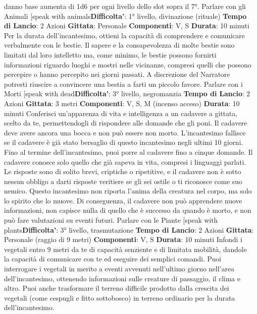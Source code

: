 \begin{multicols}{2}
danno base aumenta di 1d6 per ogni livello dello slot
sopra il 7°.
Parlare con gli Animali
[speak with animals\textbf{Difficolta'}:
1° livello, divinazione (rituale)
\textbf{Tempo di Lancio}: 2 Azioni
\textbf{Gittata}: Personale
\textbf{Componenti}: V, S
\textbf{Durata}: 10 minuti
Per la durata dell’incantesimo, ottieni la capacità di
comprendere e comunicare verbalmente con le bestie.
Il sapere e la consapevolezza di molte bestie sono
limitati dal loro intelletto ma, come minimo, le bestie
possono fornirti informazioni riguardo luoghi e mostri
nelle vicinanze, compresi quelli che possono percepire
o hanno percepito nei giorni passati. A discrezione del
Narratore potresti riuscire a convincere una bestia a farti un
piccolo favore.
Parlare con i Morti
[speak with dead\textbf{Difficolta'}:
3° livello, negromanzia
\textbf{Tempo di Lancio}: 2 Azioni
\textbf{Gittata}: 3 metri
\textbf{Componenti}: V, S, M (incenso acceso)
\textbf{Durata}: 10 minuti
Conferisci un’apparenza di vita e intelligenza a un
cadavere a gittata, scelto da te, permettendogli di
rispondere alle domande che gli poni. Il cadavere deve
avere ancora una bocca e non può essere non morto.
L’incantesimo fallisce se il cadavere è già stato
bersaglio di questo incantesimo negli ultimi 10 giorni.
Fino al termine dell’incantesimo, puoi porre al cadavere
fino a cinque domande. Il cadavere conosce solo quello
che già sapeva in vita, compresi i linguaggi parlati. Le
risposte sono di solito brevi, criptiche o ripetitive, e il
cadavere non è sotto nessun obbligo a darti risposte
veritiere se gli sei ostile o ti riconosce come suo
nemico. Questo incantesimo non riporta l’anima della
creatura nel corpo, ma solo lo spirito che lo muove. Di
conseguenza, il cadavere non può apprendere nuove
informazioni, non capisce nulla di quello che è
successo da quando è morto, e non può fare
valutazioni su eventi futuri.
Parlare con le Piante
[speak with plants\textbf{Difficolta'}:
3° livello, trasmutazione
\textbf{Tempo di Lancio}: 2 Azioni
\textbf{Gittata}: Personale (raggio di 9 metri)
\textbf{Componenti}: V, S
\textbf{Durata}: 10 minuti
Infondi i vegetali entro 9 metri da te di capacità
senziente e di limitata mobilità, dandole la capacità di
comunicare con te ed eseguire dei semplici comandi.
Puoi interrogare i vegetali in merito a eventi avvenuti
nell’ultimo giorno nell’area dell’incantesimo, ottenendo
informazioni sulle creature di passaggio, il clima e altro.
Puoi anche trasformare il terreno difficile prodotto dalla
crescita dei vegetali (come cespugli e fitto sottobosco)
in terreno ordinario per la durata dell’incantesimo.

\end{multicols}
